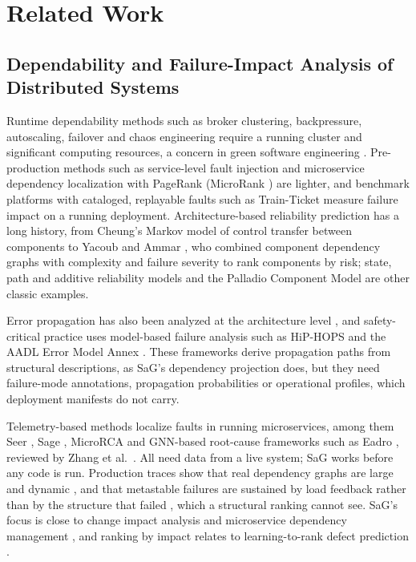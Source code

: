 \section{Related Work}
\label{sec:2}

\subsection{Dependability and Failure-Impact Analysis of Distributed Systems}
\label{sec:2.1}

Runtime dependability methods such as broker clustering, backpressure, autoscaling, failover and chaos engineering \cite{basiri2016chaos} require a running cluster and significant computing resources, a concern in green software engineering \cite{verdecchia2023greenai,schwartz2020greenai}. Pre-production methods such as service-level fault injection \cite{meiklejohn2021service} and microservice dependency localization with PageRank (MicroRank \cite{yu2021microrank}) are lighter, and benchmark platforms with cataloged, replayable faults such as Train-Ticket \cite{zhou2018trainticket} measure failure impact on a running deployment. Architecture-based reliability prediction has a long history, from Cheung's Markov model of control transfer between components \cite{cheung1980user} to Yacoub and Ammar \cite{yacoub2002reliability}, who combined component dependency graphs with complexity and failure severity to rank components by risk; state, path and additive reliability models \cite{gosevapopstojanova2001architecture} and the Palladio Component Model \cite{becker2009palladio} are other classic examples.

Error propagation has also been analyzed at the architecture level \cite{abdelmoez2004error,popic2005error,cortellessa2007modeling,hiller2004epic}, and safety-critical practice uses model-based failure analysis such as HiP-HOPS \cite{papadopoulos1999hiphops} and the AADL Error Model Annex \cite{delange2014aadl}. These frameworks derive propagation paths from structural descriptions, as SaG's dependency projection does, but they need failure-mode annotations, propagation probabilities or operational profiles, which deployment manifests do not carry.

Telemetry-based methods localize faults in running microservices, among them Seer \cite{gan2019seer}, Sage \cite{gan2021sage}, MicroRCA \cite{wu2020microrca} and GNN-based root-cause frameworks such as Eadro \cite{lee2023eadro}, reviewed by Zhang et al.~\cite{zhang2024failurediag}. All need data from a live system; SaG works before any code is run. Production traces show that real dependency graphs are large and dynamic \cite{luo2021alibaba}, and that metastable failures are sustained by load feedback rather than by the structure that failed \cite{bronson2021metastable,huang2022metastable}, which a structural ranking cannot see. SaG's focus is close to change impact analysis \cite{bohner1996impact} and microservice dependency management \cite{esparrachiari2018tracking}, and ranking by impact relates to learning-to-rank defect prediction \cite{yang2015ltr}.

